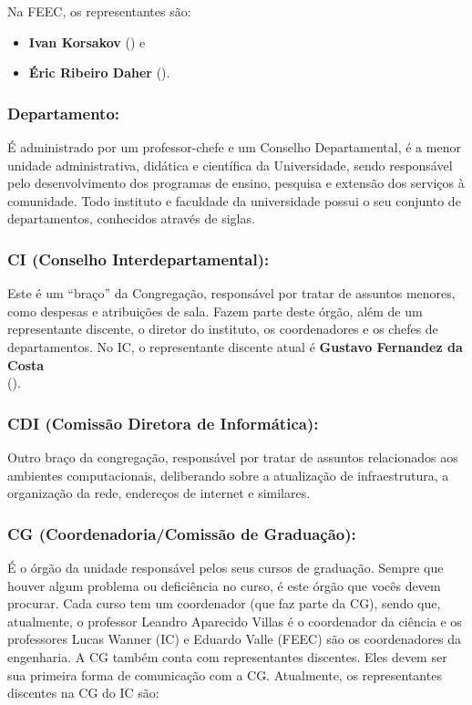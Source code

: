 Na FEEC, os representantes são:

\begin{itemize}[noitemsep]
\item \textbf{Ivan Korsakov} () e
\item \textbf{Éric Ribeiro Daher} ().
\end{itemize}

\subsubsection{Departamento:} É administrado por um professor-chefe e um
Conselho Departamental, é a menor unidade administrativa, didática e científica
da Universidade, sendo responsável pelo desenvolvimento dos programas de
ensino, pesquisa e extensão dos serviços à comunidade. Todo instituto e
faculdade da universidade possui o seu conjunto de departamentos, conhecidos
através de siglas.

\subsubsection{CI (Conselho Interdepartamental):} Este é um ``braço'' da
Congregação, responsável por tratar de assuntos menores, como despesas e
atribuições de sala. Fazem parte deste órgão, além de um representante
discente, o diretor do instituto, os coordenadores e os chefes de
departamentos. No IC, o representante discente atual é \textbf{Gustavo
Fernandez da Costa}\\
().

\subsubsection{CDI (Comissão Diretora de Informática):} Outro braço da
congregação, responsável por tratar de assuntos relacionados aos ambientes
computacionais, deliberando sobre a atualização de infraestrutura, a
organização da rede, endereços de internet e similares.

\subsubsection{CG (Coordenadoria/Comissão de Graduação):} É o órgão da unidade
responsável pelos seus cursos de graduação. Sempre que houver algum problema ou
deficiência no curso, é este órgão que vocês devem procurar.  Cada curso tem um
coordenador (que faz parte da CG), sendo que, atualmente, o professor Leandro
Aparecido Villas é o coordenador da ciência e os professores Lucas Wanner (IC)
e Eduardo Valle (FEEC) são os coordenadores da engenharia. A CG também conta
com representantes discentes. Eles devem ser sua primeira forma de comunicação
com a CG.  Atualmente, os representantes discentes na CG do IC são:

